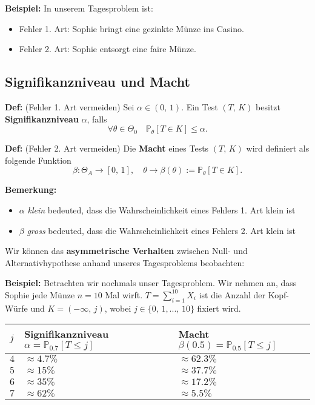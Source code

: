 \documentclass[a4paper]{extarticle}
\begin{document}
\begin{ebox}
    \textbf{Beispiel:} In unserem Tagesproblem ist:
    \begin{itemize}
        \item Fehler 1. Art: Sophie bringt eine gezinkte Münze ins Casino.
        \item Fehler 2. Art: Sophie entsorgt eine faire Münze.
    \end{itemize}
\end{ebox}

\subsection{Signifikanzniveau und Macht}

\textbf{Def:} (Fehler 1. Art vermeiden) Sei $\alpha \in (0, \, 1)$. Ein Test $(T, \, K)$ besitzt \textbf{Signifikanzniveau} $\alpha$, falls
\[
    \forall \theta \in \Theta_0 \quad \mathbb{P}_{\theta}[T \in K] \leq \alpha.
\]

\textbf{Def:} (Fehler 2. Art vermeiden) Die \textbf{Macht} eines Tests $(T, \, K)$ wird definiert als folgende Funktion
\[
    \beta : \Theta_A \to [0, \, 1], \quad \theta \to \beta(\theta) := \mathbb{P}_{\theta}[T \in K].
\]

\textbf{Bemerkung:}
\begin{itemize}
    \item $\alpha$ \textit{klein} bedeuted, dass die Wahrscheinlichkeit eines Fehlers 1. Art klein ist
    \item $\beta$ \textit{gross} bedeuted, dass die Wahrscheinlichkeit eines Fehlers 2. Art klein ist
\end{itemize}

Wir können das \textbf{asymmetrische Verhalten} zwischen Null- und Alternativhypothese anhand unseres Tagesproblems beobachten:

\begin{ebox}
    \textbf{Beispiel:} Betrachten wir nochmals unser Tagesproblem. Wir nehmen an, dass Sophie jede Münze $n = 10$ Mal wirft. $T = \sum_{i = 1}^{10} X_i$ ist die Anzahl der Kopf-Würfe und $K = (- \infty, \, j)$, wobei $j \in \{0, \, 1,..., \, 10\}$ fixiert wird.

    \begin{table}[H]
        \centering
        \begin{tabular}{|l|l|l|}
        \hline
        $j$ & Signifikanzniveau $\alpha = \mathbb{P}_{0.7}[T \leq j]$ & Macht $\beta(0.5) = \mathbb{P}_{0.5}[T \leq j]$ \\ \hline
        $4$ & $\approx 4.7 \%$ & $\approx 62.3 \%$ \\ \hline
        $5$ & $\approx 15 \%$ & $\approx 37.7 \%$ \\ \hline
        $6$ & $\approx 35 \%$ & $\approx 17.2 \%$ \\ \hline
        $7$ & $\approx 62 \%$ & $\approx 5.5 \%$ \\ \hline
        \end{tabular}
    \end{table}
\end{ebox}
\end{document}
